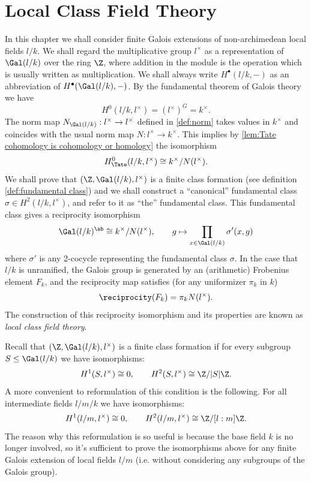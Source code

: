 \chapter{Local Class Field Theory}

In this chapter we shall consider finite Galois extensions of non-archimedean local fields $l/k$.
We shall regard the multiplicative group $l^\times$
as a representation of $\Gal(l/k)$ over the ring $\Z$, where
addition in the module is the operation which is usually written as multiplication.
We shall always write $H^\bullet(l/k,-)$ as an abbreviation of $H^\bullet(\Gal(l/k),-)$.
By the fundamental theorem of Galois theory we have
\[
	H^0(l/k,l^\times) = (l^\times)^G = k^\times.
\]
The norm map $N_{\Gal(l/k)} : l^\times \to l^\times$ defined in \ref{def:norm}
takes values in $k^\times$ and coincides with the usual norm map $N : l^\times \to k^\times$. This implies by
\ref{lem:Tate cohomology is cohomology or homology} the isomorphism
\[
	H^0_{\Tate}(l/k,l^\times) \cong k^\times / N(l^\times).
\]
We shall prove that $(\Z,\Gal(l/k),l^\times)$ is a finite class formation (see definition \ref{def:fundamental class}) and we shall construct a
``canonical'' fundamental class $\sigma \in H^2(l/k, l^\times)$, and refer to it as ``the'' fundamental class.
This fundamental class gives a reciprocity isomorphism
\[
	\Gal(l/k)^{\ab}
	\cong
	k^\times / N(l^\times), \qquad
	g \mapsto \prod_{x \in \Gal(l/k)} \sigma'(x,g)
\]
where $\sigma'$ is any 2-cocycle representing the fundamental class $\sigma$.
In the case that $l/k$ is unramified, the Galois group is generated by an
(arithmetic) Frobenius element $F_k$,
and the reciprocity map satisfies (for any uniformizer $\pi_k$ in $k$)
\[
	\reciprocity(F_k) = \pi_k N(l^\times).
\]
The construction of this reciprocity isomorphism and its properties are known as
\emph{local class field theory}.

Recall that $(\Z,\Gal(l/k),l^\times)$ is a finite class formation if for every subgroup
$S \le \Gal(l/k)$ we have isomorphisms:
\[
	H^1(S,l^\times) \cong 0, \qquad H^2(S,l^\times) \cong \Z / |S| \Z.
\]
A more convenient to reformulation of this condition is the following.
For all intermediate fields $l / m / k$ we have isomorphisms:
\[
	H^1(l/m,l^\times) \cong 0, \qquad H^2(l/m,l^\times) \cong \Z / [l:m] \Z.
\]
The reason why this reformulation is so useful is because the base field $k$ is no longer involved,
so it's sufficient to prove the isomorphisms above for any finite Galois extension of local fields $l/m$
(i.e. without considering any subgroups of the Galois group).

